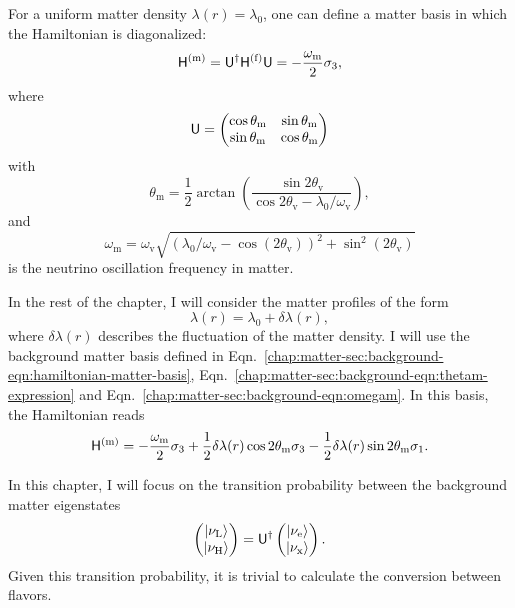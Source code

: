 For a uniform matter density $\lambda(r) = \lambda_0$, one can define a matter basis in which the Hamiltonian is diagonalized:
\begin{equation}
\mathsf H^{(\mm)}  = \mathsf U^\dagger \mathsf H^{(\ff)} \mathsf U = -\frac{\omega_\mm}{2} \sigma_3,
\label{chap:matter-sec:background-eqn:hamiltonian-matter-basis}
\end{equation}
where
\begin{equation}
\mathsf U = \begin{pmatrix}
\cos \theta_\mathrm m & \sin \theta_\mathrm m \\
\sin\theta_\mathrm m & \cos \theta_\mathrm m
\end{pmatrix}
\end{equation}
with
\begin{equation}
\theta_{\mathrm{m}}= \frac{1}{2} \arctan\left(
\frac{\sin 2\theta_{\mathrm v}}{ \cos 2\theta_{\mathrm v} - \lambda_0/\omega_{\mathrm v} } \right),
\label{chap:matter-sec:background-eqn:thetam-expression}
\end{equation}
and
\begin{equation}
\omega_{\mathrm{m}} = \omega_{\mathrm{v}} \sqrt{ ( \lambda_0/\omega_{\mathrm{v}} - \cos (2\theta_{\mathrm{v}}) )^2 + \sin^2(2\theta_{\mathrm{v}}) }
\label{chap:matter-sec:background-eqn:omegam}
\end{equation}
is the neutrino oscillation frequency in matter.

In the rest of the chapter, I will consider the matter profiles of the form
\begin{equation}
    \lambda(r) = \lambda_0 + \delta \lambda(r),
    \label{eq-general-matter-profile}
\end{equation}
where $\delta \lambda(r)$ describes the fluctuation of the matter density. I will use the background matter basis defined in Eqn.~\ref{chap:matter-sec:background-eqn:hamiltonian-matter-basis},  Eqn.~\eqref{chap:matter-sec:background-eqn:thetam-expression} and Eqn.~\eqref{chap:matter-sec:background-eqn:omegam}. In this basis, the Hamiltonian reads
\begin{equation}
    \mathsf H^{(\mathrm{m})} = -\frac{\omega_\mm}{2} \sigma_3 + \frac{1}{2} \delta\lambda(r) \cos 2\theta_{\mathrm m} \sigma_3
     - \frac{1}{2} \delta\lambda(r) \sin 2\theta_{\mathrm m} \sigma_1.
    \label{eq-hamiltonian-bg-matter-basis-general}
\end{equation}

In this chapter, I will focus on the transition probability between the background matter eigenstates
\begin{equation}
    \begin{pmatrix}
        \left| \nu_{\mathrm L}\right\rangle \\
        \left| \nu_{\mathrm H}\right\rangle
    \end{pmatrix} = \mathsf U^\dagger \begin{pmatrix}
        \left| \nu_{\mathrm e}\right\rangle \\
        \left| \nu_{\mathrm x}\right\rangle
    \end{pmatrix}.
\end{equation}
Given this transition probability, it is trivial to calculate the conversion between flavors.

